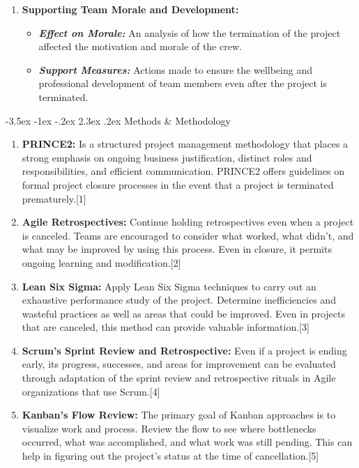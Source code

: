 \documentclass[11pt]{article}
\makeatletter
\renewcommand\section{\@startsection {section}{1}{\z@}%
                                       {-3.5ex \@plus -1ex \@minus -.2ex}%
                                       {2.3ex \@plus.2ex}%
                                       {\normalfont\fontfamily{phv}\fontsize{14}{17}\bfseries}}
\makeatother
\begin{document}
{\begin{enumerate}
        \item \textbf{Supporting Team Morale and Development:}
                \begin{itemize}
                    \item \textbf{\textit{Effect on Morale:}} An analysis of how the termination of the project affected the motivation and morale of the crew.
                    \item \textbf{\textit{Support Measures:}} Actions made to ensure the wellbeing and professional development of team members even after the project is terminated.
                \end{itemize}
    \end{enumerate}
    \section{Methods \& Methodology}
    \begin{enumerate}
        \item \textbf{PRINCE2: }Is a structured project management methodology that places a strong emphasis on ongoing business justification, distinct roles and responsibilities, and efficient communication. PRINCE2 offers guidelines on formal project closure processes in the event that a project is terminated prematurely.[1]

        \item \textbf{Agile Retrospectives:} Continue holding retrospectives even when a project is canceled. Teams are encouraged to consider what worked, what didn't, and what may be improved by using this process. Even in closure, it permits ongoing learning and modification.[2]

        \item \textbf{Lean Six Sigma:} Apply Lean Six Sigma techniques to carry out an exhaustive performance study of the project. Determine inefficiencies and wasteful practices as well as areas that could be improved. Even in projects that are canceled, this method can provide valuable information.[3]

        \item \textbf{Scrum's Sprint Review and Retrospective:} Even if a project is ending early, its progress, successes, and areas for improvement can be evaluated through adaptation of the sprint review and retrospective rituals in Agile organizations that use Scrum.[4]
        
        \item \textbf{Kanban's Flow Review:} The primary goal of Kanban approaches is to visualize work and process. Review the flow to see where bottlenecks occurred, what was accomplished, and what work was still pending. This can help in figuring out the project's status at the time of cancellation.[5]


\end{enumerate}}
\end{document}
